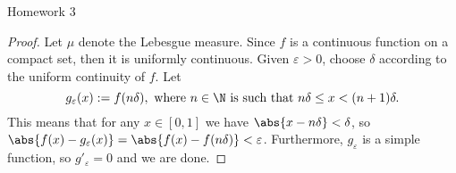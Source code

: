 \documentclass[12pt,letterpaper]{article}
\renewcommand{\epsilon}{\varepsilon}
\begin{document}
\pagestyle{fancy}
\begin{center}
{\Large Homework 3}%
\end{center}

\begin{proof}
Let $\mu$ denote the Lebesgue measure. %
Since $f$ is a continuous function on a compact set, then it is uniformly continuous. Given $\epsilon>0$, choose $\delta$ according to the uniform continuity of $f$. Let 
$$g_\epsilon (x) := f(n\delta), \text{ where $n\in \N$ is such that } n\delta\leq x<(n+1)\delta.$$
This means that for any $x\in [0,1]$ we have $\abs{ x-n\delta}<\delta$, so $\abs{f(x)-g_\epsilon(x)}=\abs{f(x)-f(n\delta)}<\epsilon$. Furthermore, $g_\epsilon$ is a simple function, so $g'_\epsilon=0$ \muae{} and we are done. 
\end{proof}
\end{document}
